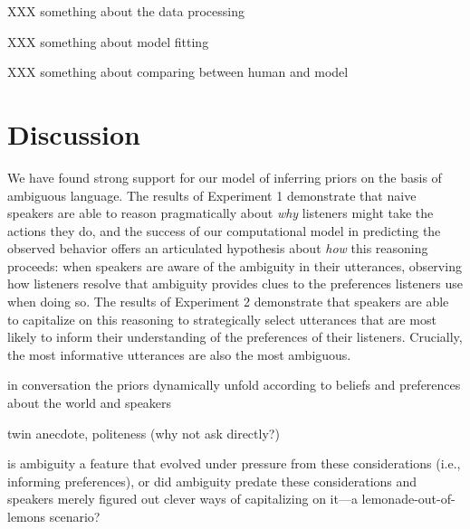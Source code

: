 \documentclass[10pt,a4paper]{article}
\begin{document}
XXX something about the data processing

XXX something about model fitting

XXX something about comparing between human and model

\section{Discussion}

We have found strong support for our model of inferring priors on the basis of ambiguous language. The results of Experiment 1 demonstrate that naive speakers are able to reason pragmatically about \emph{why} listeners might take the actions they do, and the success of our computational model in predicting the observed behavior offers an articulated hypothesis about \emph{how} this reasoning proceeds: when speakers are aware of the ambiguity in their utterances, observing how listeners resolve that ambiguity provides clues to the preferences listeners use when doing so. The results of Experiment 2 demonstrate that speakers are able to capitalize on this reasoning to strategically select utterances that are most likely to inform their understanding of the preferences of their listeners. Crucially, the most informative utterances are also the most ambiguous.


in conversation the priors dynamically unfold according to beliefs and preferences about the world and speakers

twin anecdote, politeness (why not ask directly?)

is ambiguity a feature that evolved under pressure from these considerations (i.e., informing preferences), or did ambiguity predate these considerations and speakers merely figured out clever ways of capitalizing on it---a lemonade-out-of-lemons scenario?


\setlength{\bibleftmargin}{.125in}
\setlength{\bibindent}{-\bibleftmargin}


\end{document}
